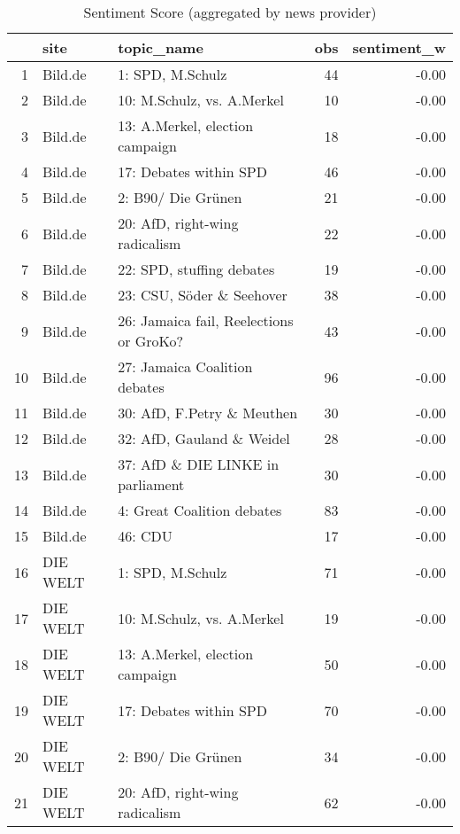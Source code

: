 \begin{table}[ht]
\centering
\caption{Sentiment Score (aggregated by news provider)} 
\begin{adjustbox}{width=\textwidth,totalheight=\textheight,keepaspectratio}
\small	
\begin{tabular}{rllrr}
  \hline
 & site & topic\_name & obs & sentiment\_w \\ 
  \hline
1 & Bild.de & 1: SPD, M.Schulz &  44 & -0.00 \\ 
  2 & Bild.de & 10: M.Schulz, vs. A.Merkel &  10 & -0.00 \\ 
  3 & Bild.de & 13: A.Merkel, election campaign &  18 & -0.00 \\ 
  4 & Bild.de & 17: Debates within SPD &  46 & -0.00 \\ 
  5 & Bild.de & 2: B90/ Die Grünen &  21 & -0.00 \\ 
  6 & Bild.de & 20: AfD, right-wing radicalism &  22 & -0.00 \\ 
  7 & Bild.de & 22: SPD, stuffing debates &  19 & -0.00 \\ 
  8 & Bild.de & 23: CSU, Söder \& Seehover &  38 & -0.00 \\ 
  9 & Bild.de & 26: Jamaica fail, Reelections or GroKo? &  43 & -0.00 \\ 
  10 & Bild.de & 27: Jamaica Coalition debates &  96 & -0.00 \\ 
  11 & Bild.de & 30: AfD, F.Petry \& Meuthen &  30 & -0.00 \\ 
  12 & Bild.de & 32: AfD, Gauland \& Weidel &  28 & -0.00 \\ 
  13 & Bild.de & 37: AfD \& DIE LINKE in parliament &  30 & -0.00 \\ 
  14 & Bild.de & 4: Great Coalition debates &  83 & -0.00 \\ 
  15 & Bild.de & 46: CDU &  17 & -0.00 \\ 
  16 & DIE WELT & 1: SPD, M.Schulz &  71 & -0.00 \\ 
  17 & DIE WELT & 10: M.Schulz, vs. A.Merkel &  19 & -0.00 \\ 
  18 & DIE WELT & 13: A.Merkel, election campaign &  50 & -0.00 \\ 
  19 & DIE WELT & 17: Debates within SPD &  70 & -0.00 \\ 
  20 & DIE WELT & 2: B90/ Die Grünen &  34 & -0.00 \\ 
  21 & DIE WELT & 20: AfD, right-wing radicalism &  62 & -0.00 \\ 

\end{tabular}
\end{adjustbox}
\end{table}
